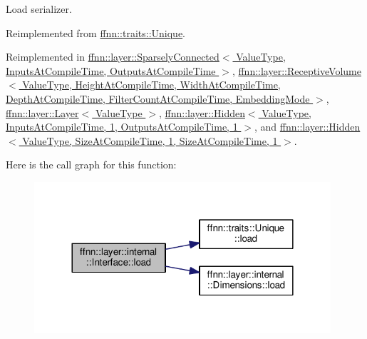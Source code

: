 Load serializer. 



Reimplemented from \hyperlink{classffnn_1_1traits_1_1_unique_af1e937c2908ed2ff707d6a7d1b5b13d2}{ffnn\-::traits\-::\-Unique}.



Reimplemented in \hyperlink{classffnn_1_1layer_1_1_sparsely_connected_a0996cd78dc2f76cab36fac2ec5c8f323}{ffnn\-::layer\-::\-Sparsely\-Connected$<$ Value\-Type, Inputs\-At\-Compile\-Time, Outputs\-At\-Compile\-Time $>$}, \hyperlink{classffnn_1_1layer_1_1_receptive_volume_aebfd8f149057b061d6880669376175e3}{ffnn\-::layer\-::\-Receptive\-Volume$<$ Value\-Type, Height\-At\-Compile\-Time, Width\-At\-Compile\-Time, Depth\-At\-Compile\-Time, Filter\-Count\-At\-Compile\-Time, Embedding\-Mode $>$}, \hyperlink{classffnn_1_1layer_1_1_layer_a23f5f3c958d888632010327471c7b012}{ffnn\-::layer\-::\-Layer$<$ Value\-Type $>$}, \hyperlink{classffnn_1_1layer_1_1_hidden_a696f61b2d9b661b7a8d6bdb3dc32b536}{ffnn\-::layer\-::\-Hidden$<$ Value\-Type, Inputs\-At\-Compile\-Time, 1, Outputs\-At\-Compile\-Time, 1 $>$}, and \hyperlink{classffnn_1_1layer_1_1_hidden_a696f61b2d9b661b7a8d6bdb3dc32b536}{ffnn\-::layer\-::\-Hidden$<$ Value\-Type, Size\-At\-Compile\-Time, 1, Size\-At\-Compile\-Time, 1 $>$}.



Here is the call graph for this function\-:
\nopagebreak
\begin{figure}[H]
\begin{center}
\leavevmode
\includegraphics[width=312pt]{classffnn_1_1layer_1_1internal_1_1_interface_a88b5bd86aafd361d3a84dc6cba211195_cgraph}
\end{center}
\end{figure}


